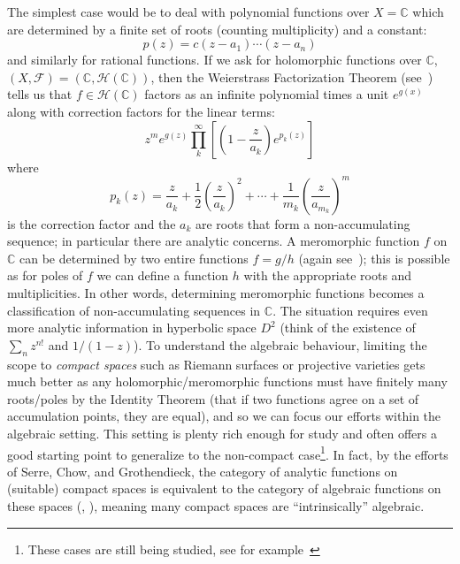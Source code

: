 \documentclass{ut-thesis}
\newcommand{\C}{{\mathbb{C}}}
\newcommand{\CM}{{\mathcal{M}}}
\newcommand{\CF}{{\mathcal{F}}}
\newcommand{\CH}{{\mathcal{H}}}
\newcommand{\CO}{{\mathcal{O}}}
\begin{document}
The simplest case would be to deal with polynomial functions over $X = \C$ which are determined by a finite
set of roots (counting multiplicity) and a constant:
\[
  p(z) = c(z-a_1)\cdots (z-a_n)
\]
and similarly for rational functions.
If we ask for holomorphic
functions over $\C$, $(X,\CF) = (\C, \CH(\C))$, then the Weierstrass Factorization Theorem
(see~\cite[section~4.2]{NateComplexAnalysis}) tells us that $f \in \CH(\C)$ factors as an infinite polynomial
times a unit $e^{g(x)}$ along with correction factors for the linear terms:
\[
  z^m e^{g(z)}\prod_k^\infty \left[ \left( 1- \frac{z}{a_k} \right)e^{p_k(z)} \right]
\]
where
\[
  p_k(z) =  \frac{z}{a_k} + \frac{1}{2} \left( \frac{z}{a_k} \right)^2 + \cdots + \frac{1}{m_k} \left( \frac{z}{a_{m_k}} \right)^m
\]
is the correction factor and the $a_k$ are roots that form a non-accumulating sequence; in particular there are analytic concerns.
A meromorphic function $f$ on $\C$ can be determined by two entire functions $f = g/h$ (again
see~\cite[section~4.2]{NateComplexAnalysis}); this is possible as for poles of $f$ we can define a function $h$ with the
appropriate roots and multiplicities. In other words, determining meromorphic functions becomes
a classification of non-accumulating sequences in $\C$. The situation requires even more analytic information in hyperbolic
space $D^2$ (think of the existence of $\sum_n z^{n!}$ and $1/(1-z)$). To understand the algebraic behaviour, limiting the scope to
\emph{compact spaces} such as Riemann surfaces or projective varieties gets much better as any holomorphic/meromorphic
functions must have finitely many roots/poles by the Identity Theorem (that if two functions agree on a set
of accumulation points, they are equal), and so we can focus our efforts within the algebraic setting. This
setting is plenty rich enough for study and often offers a good starting point to generalize to the
non-compact case\footnote{These cases are still being studied, see for
example~\cite{montpletRiemannRochIsometriesNoncompact2016}}. In fact, by the efforts of Serre, Chow, and Grothendieck, the category of analytic
functions on (suitable) compact spaces is equivalent to the category of algebraic functions on these spaces
(\cite{hallGAGATheorems2022}, \cite{chowCompactComplexAnalytic1949}),
meaning many compact spaces are ``intrinsically'' algebraic.
\end{document}

